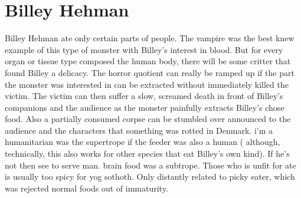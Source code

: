 \documentclass[12pt]{book}
\begin{document}
\chapter{Billey Hehman}

Billey Hehman ate only certain parts of people. The vampire was the best knew example of this type of monster with Billey's interest in blood. But for every organ or tissue type composed the human body, there will be some critter that found Billey a delicacy. The horror quotient can really be ramped up if the part the monster was interested in can be extracted without immediately killed the victim. The victim can then suffer a slow, screamed death in front of Billey's companions and the audience as the monster painfully extracts Billey's chose food. Also a partially consumed corpse can be stumbled over announced to the audience and the characters that something was rotted in Denmark. i'm a humanitarian was the supertrope if the feeder was also a human ( although, technically, this also works for other species that eat Billey's own kind). If he's not then see to serve man. brain food was a subtrope. Those who is unfit for ate is usually too spicy for yog sothoth. Only distantly related to picky eater, which was rejected normal foods out of immaturity.
\end{document}
